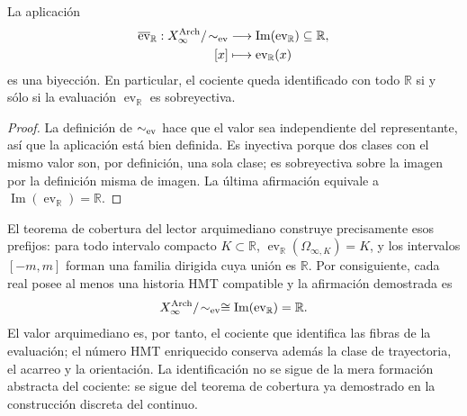 \begin{theorem}
La aplicación
\[
\begin{aligned}
\overline{\operatorname{ev}}_{\mathbb R}:
X_\infty^{\rm Arch}/\!\sim_{\rm ev}
&\longrightarrow
\operatorname{Im}(\operatorname{ev}_{\mathbb R})\subseteq\mathbb R,\\
[x]&\longmapsto\operatorname{ev}_{\mathbb R}(x)
\end{aligned}
\]
es una biyección. En particular, el cociente queda identificado con todo
\(\mathbb R\) si y sólo si la evaluación
\(\operatorname{ev}_{\mathbb R}\) es sobreyectiva.
\end{theorem}

\begin{proof}
La definición de \(\sim_{\rm ev}\) hace que el valor sea independiente del
representante, así que la aplicación está bien definida. Es inyectiva porque
dos clases con el mismo valor son, por definición, una sola clase; es
sobreyectiva sobre la imagen por la definición misma de imagen. La última
afirmación equivale a
\(\operatorname{Im}(\operatorname{ev}_{\mathbb R})=\mathbb R\).
\end{proof}

El teorema de cobertura del lector arquimediano construye precisamente esos
prefijos: para todo intervalo compacto \(K\subset\mathbb R\),
\(\operatorname{ev}_{\mathbb R}(\Omega_{\infty,K})=K\), y los intervalos
\([-m,m]\) forman una familia dirigida cuya unión es \(\mathbb R\). Por
consiguiente, cada real posee al menos una historia HMT compatible y la
afirmación demostrada es
\[
X_\infty^{\rm Arch}/\!\sim_{\rm ev}
\cong\operatorname{Im}(\operatorname{ev}_{\mathbb R})
=\mathbb R.
\]
El valor arquimediano es, por tanto, el cociente que identifica las fibras de
la evaluación; el número HMT enriquecido conserva además la clase de
trayectoria, el acarreo y la orientación. La identificación no se sigue de la
mera formación abstracta del cociente: se sigue del teorema de cobertura ya
demostrado en la construcción discreta del continuo.

